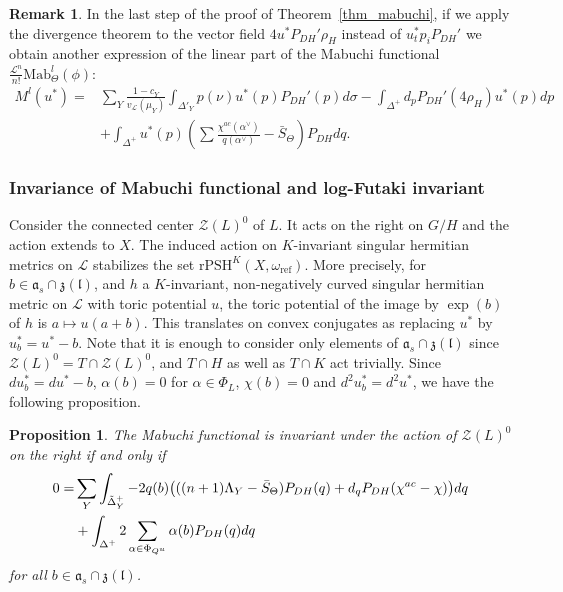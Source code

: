 \documentclass{amsart}
\newtheorem{prop}[thm]{Proposition}
\theoremstyle{definition}
\newtheorem{rem}[thm]{Remark}
\begin{document}
\begin{rem}
\label{rem_alt_Ml}
In the last step of the proof of Theorem~\ref{thm_mabuchi},  
if we apply the divergence theorem to the 
vector field $4u^*P_{DH}'\rho_H$ instead of $u_t^*p_iP_{DH}'$ we obtain 
another expression of the linear part of the Mabuchi functional 
$\frac{\mathcal{L}^n}{n!} \mathrm{Mab}_{\Theta}^l(\phi)$:  
\begin{align*}
M^l(u^*)=&
\sum_Y \frac{1-c_Y}{v_{\mathcal{L}}(\mu_Y)}
\int_{\Delta'_Y} p(\nu)u^*(p)P_{DH}'(p)d\sigma 
-\int_{\Delta^+} d_pP_{DH}'(4\rho_H)u^*(p)dp \\
& 
+\int_{\Delta^+} u^*(p)(\sum \frac{\chi^{ac}(\alpha^{\vee})}{q(\alpha^{\vee})}-\bar{S}_{\Theta})P_{DH}dq.  
\end{align*}
\end{rem}

\subsubsection{Invariance of Mabuchi functional and log-Futaki invariant}

Consider the connected center $\mathcal{Z}(L)^0$ of $L$. 
It acts on the right on $G/H$ and the action extends to $X$. 
The induced action on $K$-invariant singular hermitian metrics on $\mathcal{L}$ 
stabilizes the set $\mathrm{rPSH}^K(X,\omega_{\mathrm{ref}})$. 
More precisely, for $b\in\mathfrak{a}_s\cap \mathfrak{z}(\mathfrak{l})$, 
and $h$ a $K$-invariant, non-negatively curved singular hermitian metric on $\mathcal{L}$ with 
toric potential $u$, the toric potential of the image by $\exp(b)$ 
of $h$ is $a\mapsto u(a+b)$.
This translates on convex conjugates as replacing $u^*$ by 
$u_b^*=u^*-b$.
Note that it is enough to consider only elements of $\mathfrak{a}_s\cap \mathfrak{z}(\mathfrak{l})$
since $\mathcal{Z}(L)^0=T\cap \mathcal{Z}(L)^0$, and $T\cap H$ as well 
as $T\cap K$ act trivially.
Since 
$du^*_b=du^*-b$, $\alpha(b)=0$ for $\alpha\in\Phi_L$, 
$\chi(b)=0$ and $d^2u_b^*=d^2u^*$, 
we have the following proposition.

\begin{prop}
\label{prop_log_Futaki}
The Mabuchi functional is invariant under the action of $\mathcal{Z}(L)^0$ on 
the right if and only if 
\begin{align*}
0 = &
\sum_Y \int_{\tilde{\Delta}_Y^+}
-2q(b)\big{(}((n+1)\Lambda_Y-\bar{S}_{\Theta})P_{DH}(q)
+d_qP_{DH}(\chi^{ac}-\chi) \big{)}dq  \\ &
+\int_{\Delta^+}2\sum_{\alpha\in\Phi_{Q^u}}\alpha(b)P_{DH}(q)dq
\end{align*}
for all $b\in\mathfrak{a}_s\cap \mathfrak{z}(\mathfrak{l})$.
\end{prop}
\end{document}
